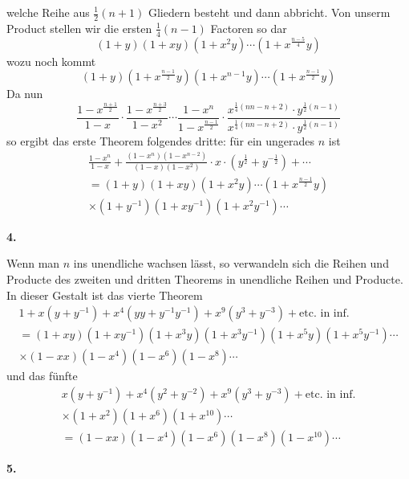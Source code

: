 \documentclass[10pt,a4paper]{article}
\begin{document}
welche Reihe aus $\frac{1}{2}(n + 1)$ Gliedern besteht und dann abbricht. Von unserm Product stellen wir die ersten $\frac{1}{4}(n - 1)$ Factoren so dar
%
\begin{equation*}
(1 + y)(1 + xy)(1 + x^2y) \cdots (1 + x^{\frac{n-5}{4}}y)
\end{equation*}
%
wozu noch kommt
%
\begin{equation*}
(1 + y)(1 + x^{\frac{n-1}{2}}y)(1 + x^{n-1}y) \cdots (1 + x^{\frac{n-1}{2}}y)
\end{equation*}
%
Da nun
%
\begin{equation*}
\frac{1 - x^{\frac{n+1}{2}}}{1 - x} \cdot \frac{1 - x^{\frac{n+3}{2}}}{1 - x^2} \cdots
\frac{1 - x^n}{1 - x^{\frac{n-1}{2}}} \cdot
\frac{x^{\frac{1}{4}(nn - n + 2)} \cdot y^{\frac{1}{2}(n - 1)}}
{x^{\frac{1}{4}(nn - n + 2)} \cdot y^{\frac{1}{2}(n - 1)}}
\end{equation*}
%
so ergibt das erste Theorem folgendes dritte: f\"ur ein ungerades $n$ ist
%
\begin{multline*}
\frac{1 - x^n}{1 - x} + \frac{(1 - x^n)(1 - x^{n-2})}{(1 - x)(1 - x^2)} \cdot x \cdot (y^{\frac{1}{2}} + y^{-\frac{1}{2}}) + \cdots \\
= (1 + y)(1 + xy)(1 + x^2y) \cdots (1 + x^{\frac{n-1}{2}}y) \\
\times (1 + y^{-1})(1 + xy^{-1})(1 + x^2y^{-1}) \cdots
\end{multline*}

\textbf{4.}

Wenn man $n$ ins unendliche wachsen l\"asst, so verwandeln sich die Reihen und Producte des zweiten und dritten Theorems in unendliche Reihen und Producte. In dieser Gestalt ist das vierte Theorem
%
\begin{multline*}
1 + x(y + y^{-1}) + x^4(yy + y^{-1}y^{-1}) + x^9(y^3 + y^{-3}) + \text{etc.\ in\ inf.} \\
= (1 + xy)(1 + xy^{-1})(1 + x^3y)(1 + x^3y^{-1})(1 + x^5y)(1 + x^5y^{-1}) \cdots \\
\times (1 - xx)(1 - x^4)(1 - x^6)(1 - x^8) \cdots
\end{multline*}
%
und das f\"unfte
%
\begin{multline*}
x(y + y^{-1}) + x^4(y^2 + y^{-2}) + x^9(y^3 + y^{-3}) + \text{etc.\ in\ inf.} \\
\times (1 + x^2)(1 + x^6)(1 + x^{10}) \cdots \\
= (1 - xx)(1 - x^4)(1 - x^6)(1 - x^8)(1 - x^{10}) \cdots
\end{multline*}

\newpage
\textbf{5.}
\end{document}
